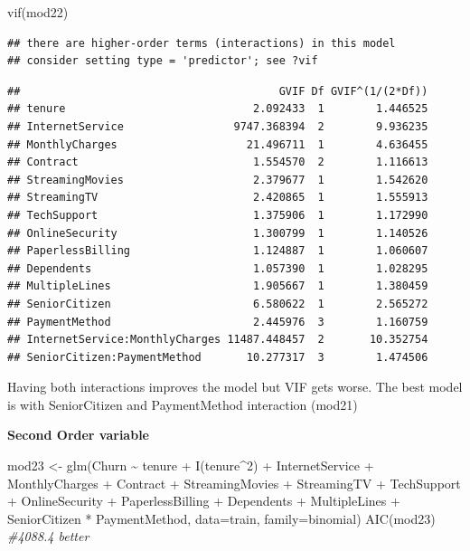 \documentclass[
  twoside]{article}
\newenvironment{Shaded}{\begin{snugshade}}{\end{snugshade}}
\newcommand{\AttributeTok}[1]{\textcolor[rgb]{0.77,0.63,0.00}{#1}}
\newcommand{\CommentTok}[1]{\textcolor[rgb]{0.56,0.35,0.01}{\textit{#1}}}
\newcommand{\DecValTok}[1]{\textcolor[rgb]{0.00,0.00,0.81}{#1}}
\newcommand{\FunctionTok}[1]{\textcolor[rgb]{0.00,0.00,0.00}{#1}}
\newcommand{\NormalTok}[1]{#1}
\newcommand{\OtherTok}[1]{\textcolor[rgb]{0.56,0.35,0.01}{#1}}
\newcommand{\SpecialCharTok}[1]{\textcolor[rgb]{0.00,0.00,0.00}{#1}}
\begin{document}
\begin{Shaded}
\begin{Highlighting}[]
\FunctionTok{vif}\NormalTok{(mod22)}
\end{Highlighting}
\end{Shaded}

\begin{verbatim}
## there are higher-order terms (interactions) in this model
## consider setting type = 'predictor'; see ?vif
\end{verbatim}

\begin{verbatim}
##                                        GVIF Df GVIF^(1/(2*Df))
## tenure                             2.092433  1        1.446525
## InternetService                 9747.368394  2        9.936235
## MonthlyCharges                    21.496711  1        4.636455
## Contract                           1.554570  2        1.116613
## StreamingMovies                    2.379677  1        1.542620
## StreamingTV                        2.420865  1        1.555913
## TechSupport                        1.375906  1        1.172990
## OnlineSecurity                     1.300799  1        1.140526
## PaperlessBilling                   1.124887  1        1.060607
## Dependents                         1.057390  1        1.028295
## MultipleLines                      1.905667  1        1.380459
## SeniorCitizen                      6.580622  1        2.565272
## PaymentMethod                      2.445976  3        1.160759
## InternetService:MonthlyCharges 11487.448457  2       10.352754
## SeniorCitizen:PaymentMethod       10.277317  3        1.474506
\end{verbatim}

Having both interactions improves the model but VIF gets worse. The best
model is with SeniorCitizen and PaymentMethod interaction (mod21)

\textbf{Second Order variable}

\begin{Shaded}
\begin{Highlighting}[]
\NormalTok{mod23 }\OtherTok{\textless{}{-}} \FunctionTok{glm}\NormalTok{(Churn }\SpecialCharTok{\textasciitilde{}}\NormalTok{ tenure }\SpecialCharTok{+} \FunctionTok{I}\NormalTok{(tenure}\SpecialCharTok{\^{}}\DecValTok{2}\NormalTok{) }\SpecialCharTok{+}\NormalTok{ InternetService }\SpecialCharTok{+}\NormalTok{ MonthlyCharges }\SpecialCharTok{+} 
\NormalTok{               Contract }\SpecialCharTok{+}\NormalTok{ StreamingMovies }\SpecialCharTok{+}\NormalTok{ StreamingTV }\SpecialCharTok{+}\NormalTok{ TechSupport }\SpecialCharTok{+} 
\NormalTok{               OnlineSecurity }\SpecialCharTok{+}\NormalTok{ PaperlessBilling }\SpecialCharTok{+}\NormalTok{ Dependents }\SpecialCharTok{+}\NormalTok{ MultipleLines }\SpecialCharTok{+} 
\NormalTok{               SeniorCitizen }\SpecialCharTok{*}\NormalTok{ PaymentMethod, }\AttributeTok{data=}\NormalTok{train, }\AttributeTok{family=}\NormalTok{binomial)}
\FunctionTok{AIC}\NormalTok{(mod23) }\CommentTok{\#4088.4 better}
\end{Highlighting}
\end{Shaded}
\end{document}
